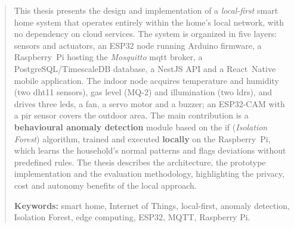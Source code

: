 \documentclass[a4paper,12pt]{scrreprt}
\def \chapters {./chapters}
\begin{document}
\renewcommand{\abstractname}{Abstract}
\begin{abstract}
\noindent
This thesis presents the design and implementation of a \textit{local-first}
smart home system that operates entirely within the home's local network, with no
dependency on cloud services. The system is organized in five layers: sensors and
actuators, an ESP32 node running Arduino firmware, a Raspberry~Pi hosting the
\textit{Mosquitto} \gls{mqtt} broker, a PostgreSQL/TimescaleDB database, a NestJS
API and a React~Native mobile application. The indoor node acquires temperature and
humidity (two \gls{dht}11 sensors), gas level (MQ-2) and illumination (two
\gls{ldr}s), and drives three \gls{led}s, a fan, a servo motor and a buzzer; an
ESP32-CAM with a \gls{pir} sensor covers the outdoor area. The main contribution is
a \textbf{behavioural anomaly detection} module based on the \gls{if}
(\textit{Isolation Forest}) algorithm, trained and executed \textbf{locally} on the
Raspberry~Pi, which learns the household's normal patterns and flags deviations
without predefined rules. The thesis describes the architecture, the prototype
implementation and the evaluation methodology, highlighting the privacy, cost and
autonomy benefits of the local approach.

\medskip\noindent\textbf{Keywords:} smart home, Internet of Things, local-first,
anomaly detection, Isolation Forest, edge computing, ESP32, MQTT, Raspberry Pi.
\end{abstract}

\tableofcontents
\listoffigures
{}
\listoftables
{}

\printnoidxglossaries
\clearpage

\pagestyle{headings}








\printbibliography[heading=bibintoc]
\end{document}
